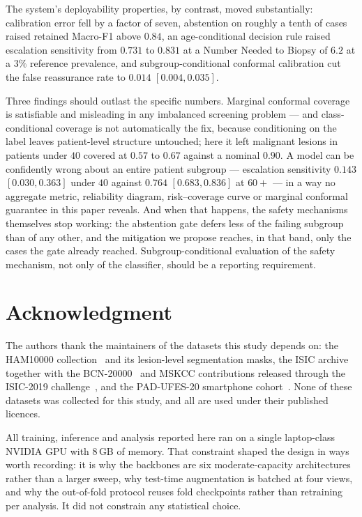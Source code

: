 \documentclass[journal]{IEEEtran}
\begin{document}
The system's deployability properties, by contrast, moved substantially: calibration error
fell by a factor of seven, abstention on roughly a tenth of cases raised retained Macro-F1
above $0.84$, an age-conditional decision rule raised escalation sensitivity from $0.731$ to
$0.831$ at a Number Needed to Biopsy of $6.2$ at a $3\%$ reference prevalence, and
subgroup-conditional conformal calibration cut the false reassurance rate to $0.014$
$[0.004, 0.035]$.

Three findings should outlast the specific numbers. Marginal conformal coverage is
satisfiable and misleading in any imbalanced screening problem --- and class-conditional
coverage is not automatically the fix, because conditioning on the label leaves patient-level
structure untouched; here it left malignant lesions in patients under $40$ covered at $0.57$
to $0.67$ against a nominal $0.90$. A model can be confidently wrong about an entire patient
subgroup --- escalation sensitivity $0.143$ $[0.030, 0.363]$ under $40$ against $0.764$
$[0.683, 0.836]$ at $60+$ --- in a way no aggregate metric, reliability diagram,
risk--coverage curve or marginal conformal guarantee in this paper reveals. And when that
happens, the safety mechanisms themselves stop working: the abstention gate defers less of
the failing subgroup than of any other, and the mitigation we propose reaches, in that band,
only the cases the gate already reached. Subgroup-conditional evaluation of the safety
mechanism, not only of the classifier, should be a reporting requirement.

\section*{Acknowledgment}
The authors thank the maintainers of the datasets this study depends on: the HAM10000
collection~\cite{tschandl2018ham10000} and its lesion-level segmentation masks, the ISIC
archive together with the BCN-20000~\cite{combalia2019bcn20000} and MSKCC contributions
released through the ISIC-2019 challenge~\cite{codella2018isic}, and the PAD-UFES-20
smartphone cohort~\cite{pacheco2020padufes}. None of these datasets was collected for this
study, and all are used under their published licences.

All training, inference and analysis reported here ran on a single laptop-class NVIDIA GPU
with $8$\,GB of memory. That constraint shaped the design in ways worth recording: it is why
the backbones are six moderate-capacity architectures rather than a larger sweep, why
test-time augmentation is batched at four views, and why the out-of-fold protocol reuses fold
checkpoints rather than retraining per analysis. It did not constrain any statistical choice.
\end{document}
